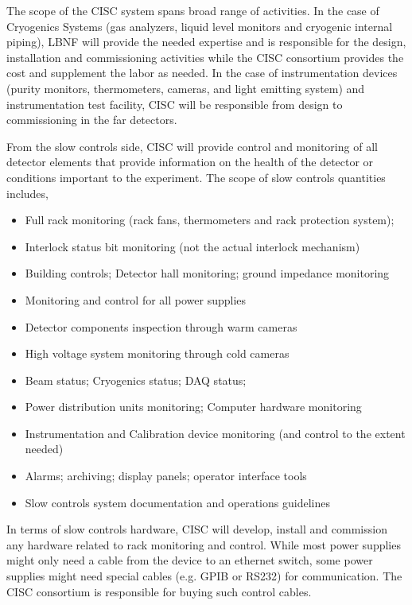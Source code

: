 
The scope of the CISC system spans broad range of activities. In the
case of Cryogenics Systems (gas analyzers, liquid level monitors and
cryogenic internal piping), LBNF will provide the needed expertise and
is responsible for the design, installation and commissioning activities
while the CISC consortium provides the cost and supplement the labor as
needed. In the case of instrumentation devices (purity monitors,
thermometers, cameras, and light emitting system) and instrumentation
test facility, CISC will be responsible from design to commissioning in
the far detectors.

From the slow controls side, CISC will provide control and monitoring of
all detector elements that provide information on the health of the
detector or conditions important to the experiment. The scope of slow
controls quantities includes,

\begin{itemize}
\item
  Full rack monitoring (rack fans, thermometers and rack protection
  system); 
\item
  Interlock status bit monitoring (not the actual interlock mechanism)
\item
  Building controls; Detector hall monitoring; ground impedance
  monitoring
\item
  Monitoring and control for all power supplies
\item
  Detector components inspection through warm cameras
\item
  High voltage system monitoring through cold cameras
\item
  Beam status; Cryogenics status; DAQ status; 
\item
  Power distribution units monitoring; Computer hardware monitoring
\item
  Instrumentation and Calibration device monitoring (and control to the
  extent needed)
\item
  Alarms; archiving; display panels; operator interface tools 
\item
  Slow controls system documentation and operations guidelines
\end{itemize}

In terms of slow controls hardware, CISC will develop, install and
commission any hardware related to rack monitoring and control. While
most power supplies might only need a cable from the device to an
ethernet switch, some power supplies might need special cables (e.g.
GPIB or RS232) for communication. The CISC consortium is responsible for
buying such control cables.

